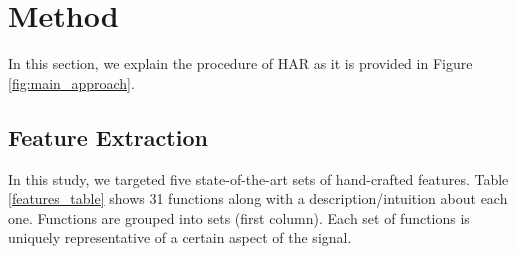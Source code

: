 \documentclass[journal,article,submit,moreauthors,pdftex]{Definitions/mdpi}
\newcommand{\diego}[1]{\textcolor{gray}{{\it [Diego: #1]}}}
\begin{document}


\section{Method}
In this section, we explain the procedure of HAR as it is provided in Figure \ref{fig:main_approach}.

\subsection{Feature Extraction}

In this study, we targeted five state-of-the-art sets of hand-crafted features. Table \ref{features_table} shows 31 functions along with a description/intuition about each one. Functions are grouped into sets (first column). Each set of functions is uniquely representative of a certain aspect of the signal.
 
\end{document}
